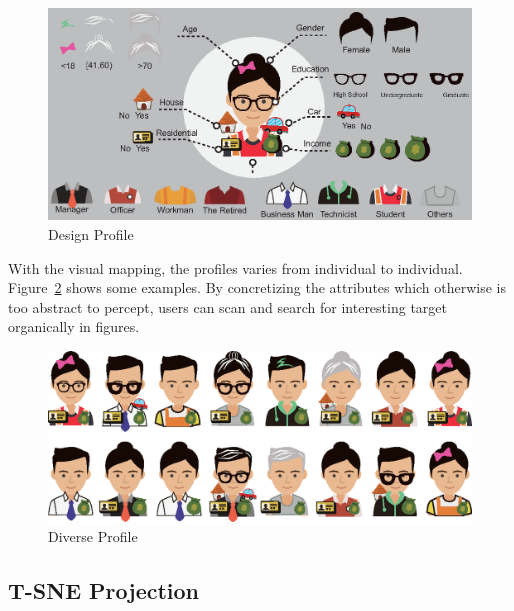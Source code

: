 \begin{figure}[htb!]
 \centering %
 \includegraphics[width=\columnwidth]{pictures/design_profile}
 \caption{Design Profile}
 \label{fig:design_profile}
\end{figure}

With the visual mapping, the profiles varies from individual to individual. Figure~\ref{fig:div_profile} shows some examples. By concretizing the attributes which otherwise is too abstract to percept, users can scan and search for interesting target organically in figures.

\begin{figure}[htb!]
 \centering %
 \includegraphics[width=\columnwidth]{pictures/design_div}
 \caption{Diverse Profile}
 \label{fig:div_profile}
\end{figure}

\subsection{T-SNE Projection}

